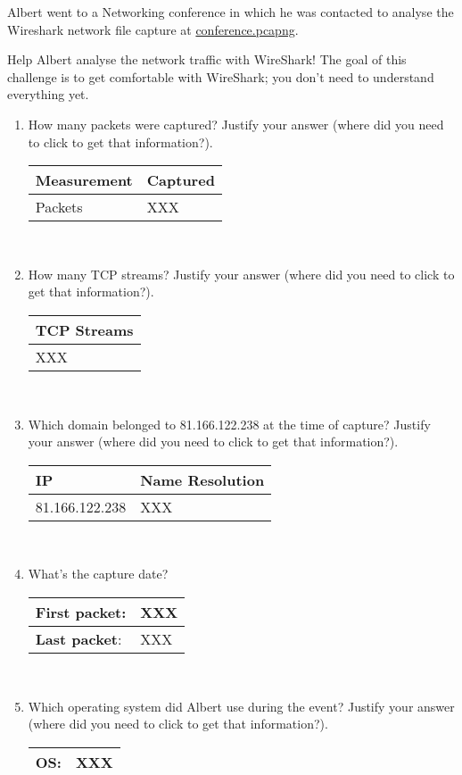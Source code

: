 \documentclass{article}
\begin{document}

\noindent
Albert went to a Networking conference in which he was contacted to analyse the Wireshark network
file capture at \href{https://github.com/ncatanoc/redes\_algarve/blob/main/labs/lab02/conference.pcapng}{conference.pcapng}.

\bigskip

\noindent Help Albert analyse the network traffic with WireShark! The goal of this challenge is
  to get comfortable with WireShark; you don't need to understand everything yet.
  
\begin{enumerate}[1.]
\item How many packets were captured? Justify your answer (where did
  you need to click to get that information?).  \\
  \begin{tabular}{|l|l|}\hline
    {\bf{}Measurement} &  {\bf{}Captured} \\ \hline
    Packets & XXX \\ \hline
  \end{tabular}\\
\item How many TCP streams? Justify your answer (where did
  you need to click to get that information?).\\
  \begin{tabular}{|l|}\hline
    {\bf{}TCP Streams} \\ \hline
    XXX \\ \hline
  \end{tabular}\\
\item Which domain belonged to 81.166.122.238 at the time of capture? Justify your answer (where did
  you need to click to get that information?).  \\
  \begin{tabular}{|l|l|}\hline
    {\bf{}IP} &  {\bf{}Name Resolution} \\ \hline
    81.166.122.238 & XXX \\ \hline
  \end{tabular}\\
  
\item What's the capture date?  \\  
  \begin{tabular}{|l|l|}\hline
    {\bf{}First packet}: & XXX \\ \hline
    {\bf{}Last packet}:  & XXX \\ \hline
  \end{tabular}\\  
\item Which operating system did Albert use during the event? Justify your answer (where did
  you need to click to get that information?). \\
  \begin{tabular}{|l|l|}\hline
    {\bf{}OS}: & XXX \\ \hline
  \end{tabular}
  
\end{enumerate}
\end{document}
